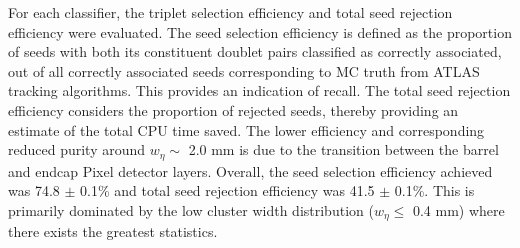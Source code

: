 For each classifier, the triplet selection efficiency and total seed rejection efficiency were evaluated. The seed selection efficiency is defined as the proportion of seeds with both its constituent doublet pairs classified as correctly associated, out of all correctly associated seeds corresponding to MC truth from ATLAS tracking algorithms. This provides an indication of recall. The total seed rejection efficiency considers the proportion of rejected seeds, thereby providing an estimate of the total CPU time saved. The lower efficiency and corresponding reduced purity around $w_{\eta} \sim$ 2.0 mm is due to the transition between the barrel and endcap Pixel detector layers. Overall, the seed selection efficiency achieved was 74.8 $\pm$ 0.1\% and total seed rejection efficiency was 41.5 $\pm$ 0.1\%. This is primarily dominated by the low cluster width distribution ($w_{\eta} \leq$ 0.4 mm) where there exists the greatest statistics.




